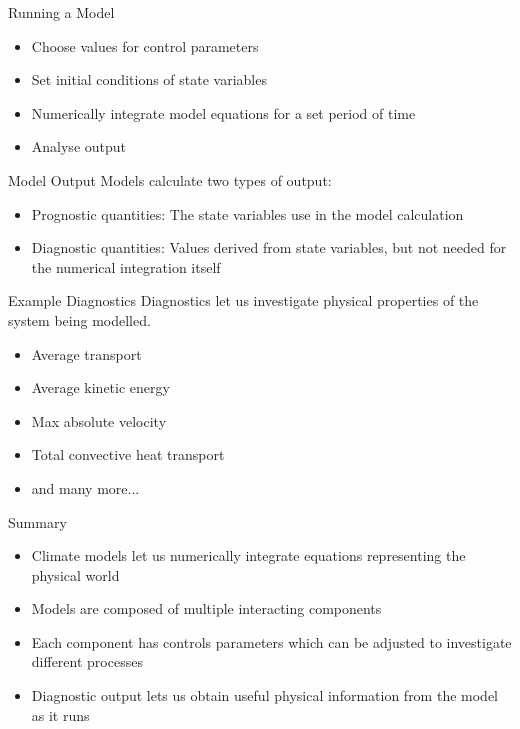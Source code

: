 \documentclass[a4paper]{beamer}
\begin{document}
\begin{frame}{Running a Model}
\begin{itemize}
\item Choose values for control parameters
\item Set initial conditions of state variables
\item Numerically integrate model equations for a set period of time
\item Analyse output
\end{itemize}
\end{frame}

\begin{frame}{Model Output}
Models calculate two types of output:
\begin{itemize}
\item Prognostic quantities: The state variables use in the model calculation
\item Diagnostic quantities: Values derived from state variables, but not needed for the numerical integration itself
\end{itemize}
\end{frame}

\begin{frame}{Example Diagnostics}
Diagnostics let us investigate physical properties of the system being modelled.
\begin{itemize}
\item Average transport
\item Average kinetic energy
\item Max absolute velocity
\item Total convective heat transport
\item and many more...
\end{itemize}
\end{frame}

\begin{frame}{Summary}

\begin{itemize}
\item Climate models let us numerically integrate equations representing the physical world
\item Models are composed of multiple interacting components
\item Each component has controls parameters which can be adjusted to investigate different processes
\item Diagnostic output lets us obtain useful physical information from the model as it runs
\end{itemize}
\end{frame}
\end{document}
